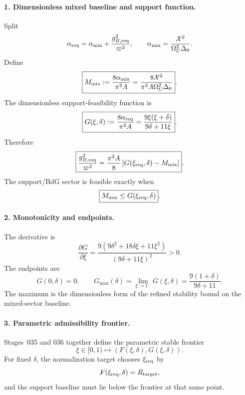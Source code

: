 \paragraph{1. Dimensionless mixed baseline and support function.}
Split
\begin{equation}
\alpha_{\rm req}=\alpha_{\rm mix}+\frac{g_{B,{\rm req}}^2}{\varpi^2},
\qquad
\alpha_{\rm mix}=\frac{\mathcal X^2}{\Omega_U^2\Delta_0}.
\end{equation}
Define
\begin{equation}
\label{eq:app-stage036-Mmix}
\boxed{
M_{\rm mix}:=\frac{8\alpha_{\rm mix}}{\pi^2A}
=
\frac{8\mathcal X^2}{\pi^2A\Omega_U^2\Delta_0}}.
\end{equation}
The dimensionless support-feasibility function is
\begin{equation}
\label{eq:app-stage036-G}
\boxed{
G(\xi,\delta):=\frac{8\alpha_{\rm req}}{\pi^2A}
=
\frac{9\xi(\xi+\delta)}{9\delta+11\xi}}.
\end{equation}
Therefore
\begin{equation}
\label{eq:app-stage036-gBreq}
\boxed{
\frac{g_{B,{\rm req}}^2}{\varpi^2}
=\frac{\pi^2A}{8}\left[G(\xi_{\rm req},\delta)-M_{\rm mix}\right]}.
\end{equation}
The support/BdG sector is feasible exactly when
\begin{equation}
\label{eq:app-stage036-feasible}
\boxed{
M_{\rm mix}\leq G(\xi_{\rm req},\delta)}.
\end{equation}

\paragraph{2. Monotonicity and endpoints.}
The derivative is
\begin{equation}
\label{eq:app-stage036-G-derivative}
\boxed{
\frac{\partial G}{\partial\xi}
=
\frac{9(9\delta^2+18\delta\xi+11\xi^2)}{(9\delta+11\xi)^2}>0}.
\end{equation}
The endpoints are
\begin{equation}
\label{eq:app-stage036-G-endpoints}
G(0,\delta)=0,
\qquad
G_{\max}(\delta)=\lim_{\xi\to1^-}G(\xi,\delta)
=\frac{9(1+\delta)}{9\delta+11}.
\end{equation}
The maximum is the dimensionless form of the refined stability bound on the mixed-sector baseline.

\paragraph{3. Parametric admissibility frontier.}
Stages~035 and 036 together define the parametric stable frontier
\begin{equation}
\label{eq:app-stage036-param-frontier}
\boxed{
\xi\in[0,1)
\longmapsto
\left(F(\xi,\delta),G(\xi,\delta)\right)}.
\end{equation}
For fixed \(\delta\), the normalization target chooses \(\xi_{\rm req}\) by
\begin{equation}
\label{eq:app-stage036-Fselect}
F(\xi_{\rm req},\delta)=R_{\rm target},
\end{equation}
and the support baseline must lie below the frontier at that same point.

